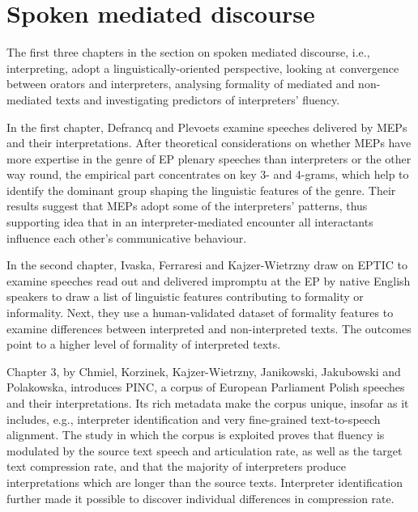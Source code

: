 \documentclass[output=paper]{langscibook}
\begin{document}
\section{Spoken mediated discourse}

The first three chapters in the section on spoken mediated discourse, i.e., interpreting, adopt a linguistically-oriented perspective, looking at convergence between orators and interpreters, analysing formality of mediated and non-me\-di\-ated texts and investigating predictors of interpreters’ fluency.

\begin{sloppypar}
In the first chapter, Defrancq and Plevoets examine speeches delivered by MEPs and their interpretations. After theoretical considerations on whether MEPs have more expertise in the genre of EP plenary speeches than interpreters or the other way round, the empirical part concentrates on key 3- and 4-grams, which help to identify the dominant group shaping the linguistic features of the genre. Their results suggest that MEPs adopt some of the interpreters’ patterns, thus supporting   idea that in an interpreter-mediated encounter all interactants influence each other’s communicative behaviour. 
\end{sloppypar}

In the second chapter, Ivaska, Ferraresi and Kajzer-Wietrzny draw on EPTIC to examine speeches read out and delivered impromptu at the EP by native English speakers to draw a list of linguistic features contributing to formality or informality. Next, they use a human-validated dataset of formality features to examine differences between interpreted and non-interpreted texts. The outcomes point to a higher level of formality of interpreted texts.

Chapter 3, by Chmiel, Korzinek, Kajzer-Wietrzny, Janikowski, Jakubowski and Polakowska, introduces PINC, a corpus of European Parliament Polish speeches and their interpretations. Its rich metadata make the corpus unique, insofar as it includes, e.g., interpreter identification and very fine-grained text-to-speech alignment. The study in which the corpus is exploited proves that fluency is modulated by the source text speech and articulation rate, as well as the target text compression rate, and that the majority of interpreters produce interpretations which are longer than the source texts. Interpreter identification further made it possible to discover individual differences in compression rate. 
\end{document}
